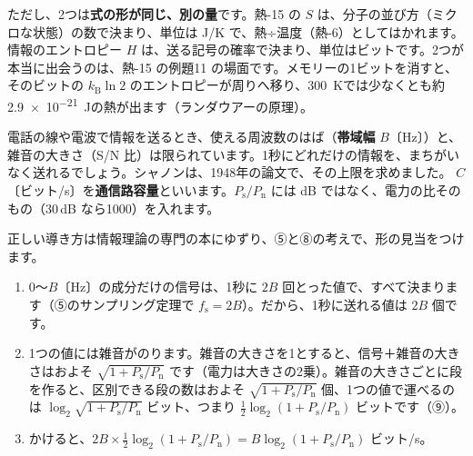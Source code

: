 ただし、2つは\textbf{式の形が同じ、別の量}です。熱-15 の $S$ は、分子の並び方（ミクロな状態）の数で決まり、単位は J/K で、熱÷温度（熱-6）としてはかれます。情報のエントロピー $H$ は、送る記号の確率で決まり、単位はビットです。2つが本当に出会うのは、熱-15 の例題11 の場面です。メモリーの1ビットを消すと、そのビットの $k_{\mathrm B}\ln2$ のエントロピーが周りへ移り、\qty{300}{K}では少なくとも約\qty{2.9e-21}{J}の熱が出ます（ランダウアーの原理）。

\label{ph:波-11:sec10}
電話の線や電波で情報を送るとき、使える周波数のはば（\textbf{帯域幅} $B$〔Hz〕）と、雑音の大きさ（S/N 比）は限られています。1秒にどれだけの情報を、まちがいなく送れるでしょう。シャノンは、1948年の論文で、その上限を求めました。
\label{ph:波-11:shannon}$C$〔ビット/s〕を\textbf{通信路容量}といいます。$P_{\mathrm s}/P_{\mathrm n}$ には dB ではなく、電力の比そのもの（30\,dB なら1000）を入れます。

正しい導き方は情報理論の専門の本にゆずり、⑤と⑧の考えで、形の見当をつけます。
\begin{enumerate}[label={\bkcircled{\arabic*}}, leftmargin=2.4\zw, itemsep=1pt, topsep=2pt]
\item 0〜$B$〔Hz〕の成分だけの信号は、1秒に $2B$ 回とった値で、すべて決まります（⑤のサンプリング定理で $f_{\mathrm s}=2B$）。だから、1秒に送れる値は $2B$ 個です。
\item 1つの値には雑音がのります。雑音の大きさを1とすると、信号＋雑音の大きさはおよそ $\sqrt{1+P_{\mathrm s}/P_{\mathrm n}}$ です（電力は大きさの2乗）。雑音の大きさごとに段を作ると、区別できる段の数はおよそ $\sqrt{1+P_{\mathrm s}/P_{\mathrm n}}$ 個、1つの値で運べるのは $\log_2\sqrt{1+P_{\mathrm s}/P_{\mathrm n}}$ ビット、つまり $\tfrac12\log_2(1+P_{\mathrm s}/P_{\mathrm n})$ ビットです（⑨）。
\item かけると、$2B\times\tfrac12\log_2(1+P_{\mathrm s}/P_{\mathrm n})=B\log_2(1+P_{\mathrm s}/P_{\mathrm n})$ ビット/s。
\end{enumerate}

